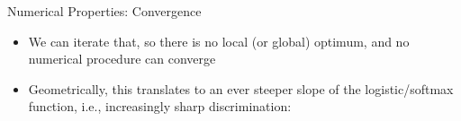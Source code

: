 \documentclass[11pt,compress,t,notes=noshow, xcolor=table]{beamer}
\begin{document}
\begin{vbframe}{Numerical Properties: Convergence}
\begin{itemize}
\item We can iterate that, so there is no local (or global) optimum, and no numerical procedure can converge
  \end{itemize}

\framebreak

\begin{itemize}
  \small
  \item
  Geometrically, this translates to an ever steeper slope of the 
  logistic/softmax function, i.e., increasingly sharp discrimination:
  

\end{itemize}
\end{vbframe}
\end{document}
